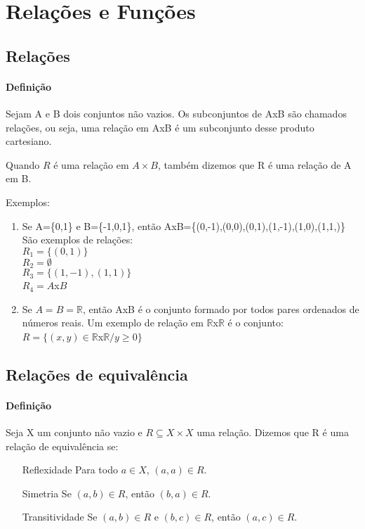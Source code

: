 \chapter{Rela{\c c}{\~o}es e Fun{\c c}{\~o}es}
\section{Rela{\c c}{\~o}es}
\subsubsection{Defini{\c c}{\~a}o}
Sejam A e B dois conjuntos n{\~a}o vazios. Os subconjuntos de AxB s{\~a}o chamados rela{\c c}{\~o}es, ou seja, uma rela{\c c}{\~a}o em AxB {\'e} um subconjunto desse produto cartesiano.

Quando $R$ {\'e} uma rela{\c c}{\~a}o em $A \times B$, tamb{\'e}m dizemos que R {\'e} uma rela{\c c}{\~a}o de A em B.

Exemplos:
\begin{enumerate}
\item Se A=\{0,1\} e B=\{-1,0,1\}, ent{\~a}o AxB=\{(0,-1),(0,0),(0,1),(1,-1),(1,0),(1,1,)\}\\
S{\~a}o exemplos de rela{\c c}{\~o}es:\\
$R_{1}=\{(0,1)\}$\\
$R_{2}=\emptyset$\\
$R_{3}=\{(1,-1),(1,1)\}$\\
$R_{4}=A$x$B$
\item Se $A=B=\mathbb{R}$, ent{\~a}o AxB {\'e} o conjunto formado por todos pares ordenados de n{\'u}meros reais. Um exemplo de rela{\c c}{\~a}o em $\mathbb{R}$x$\mathbb{R}$ {\'e} o conjunto:\\
$R=\{(x,y)\in \mathbb{R}$x$\mathbb{R}/ y\geq 0\}$
\end{enumerate}

\section{Rela{\c c}{\~o}es de equival{\^e}ncia}
\subsubsection{Defini{\c c}{\~a}o}
\begin{definicao} Seja X um conjunto n{\~a}o vazio e $R\subseteq X \times X$ uma rela{\c c}{\~a}o. Dizemos que R {\'e} uma rela{\c c}{\~a}o de equival{\^e}ncia se:
\begin{enumerate}
\item[Reflexidade] Para todo $a \in X$, $(a,a)\in R$.
\item[Simetria] Se $(a, b) \in R$, então $(b, a) \in R$.
\item[Transitividade] Se $(a, b) \in R$ e $(b, c) \in R$, então $(a, c)\in R$.
\end{enumerate}
\end{definicao}

